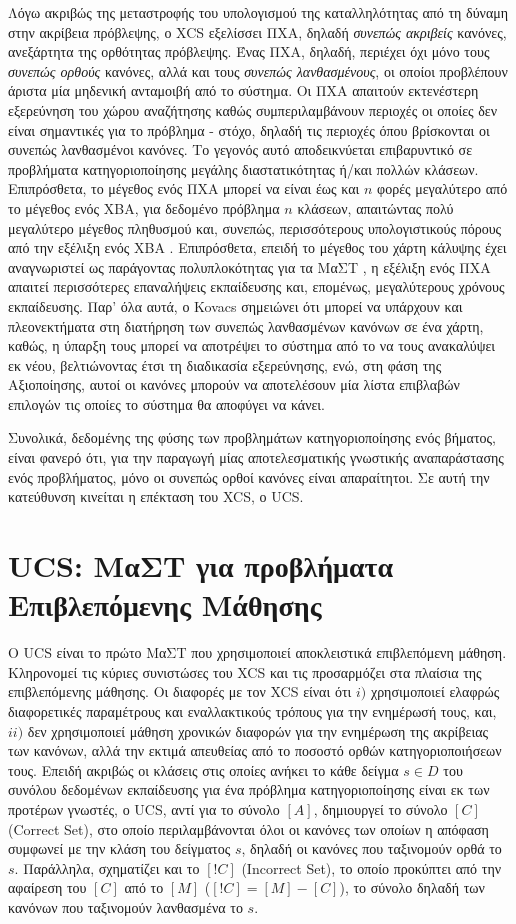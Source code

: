 Λόγω ακριβώς της μεταστροφής του υπολογισμού της καταλληλότητας από τη δύναμη στην ακρίβεια πρόβλεψης, ο XCS εξελίσσει ΠΧΑ, δηλαδή \emph{συνεπώς ακριβείς} κανόνες, ανεξάρτητα της ορθότητας πρόβλεψης. Ένας ΠΧΑ, δηλαδή, περιέχει όχι μόνο τους \emph{συνεπώς ορθούς} κανόνες, αλλά και τους \emph{συνεπώς λανθασμένους}, οι οποίοι προβλέπουν άριστα μία μηδενική ανταμοιβή από το σύστημα. Οι ΠΧΑ απαιτούν εκτενέστερη εξερεύνηση του χώρου αναζήτησης καθώς συμπεριλαμβάνουν περιοχές οι οποίες δεν είναι σημαντικές για το πρόβλημα - στόχο, δηλαδή τις περιοχές όπου βρίσκονται οι συνεπώς λανθασμένοι κανόνες. Το γεγονός αυτό αποδεικνύεται επιβαρυντικό σε προβλήματα κατηγοριοποίησης μεγάλης διαστατικότητας ή/και πολλών κλάσεων. Επιπρόσθετα, το μέγεθος ενός ΠΧΑ μπορεί να είναι έως και $n$ φορές μεγαλύτερο από το μέγεθος ενός ΧΒΑ, για δεδομένο πρόβλημα $n$ κλάσεων, απαιτώντας πολύ μεγαλύτερο μέγεθος πληθυσμού και, συνεπώς, περισσότερους υπολογιστικούς πόρους από την εξέλιξη ενός ΧΒΑ \cite{kovacs00}. Επιπρόσθετα, επειδή το μέγεθος του χάρτη κάλυψης έχει αναγνωριστεί ως παράγοντας πολυπλοκότητας για τα ΜαΣΤ \cite{kovacs01}, η εξέλιξη ενός ΠΧΑ απαιτεί περισσότερες επαναλήψεις εκπαίδευσης και, επομένως, μεγαλύτερους χρόνους εκπαίδευσης. Παρ' όλα αυτά, ο Kovacs \cite{kovacs00} σημειώνει ότι μπορεί να υπάρχουν και πλεονεκτήματα στη διατήρηση των συνεπώς λανθασμένων κανόνων σε ένα χάρτη, καθώς, η ύπαρξη τους μπορεί να αποτρέψει το σύστημα από το να τους ανακαλύψει εκ νέου, βελτιώνοντας έτσι τη διαδικασία εξερεύνησης, ενώ, στη φάση της Αξιοποίησης, αυτοί οι κανόνες μπορούν να αποτελέσουν μία λίστα επιβλαβών επιλογών τις οποίες το σύστημα θα αποφύγει να κάνει.

Συνολικά, δεδομένης της φύσης των προβλημάτων κατηγοριοποίησης ενός βήματος, είναι φανερό ότι, για την παραγωγή μίας αποτελεσματικής γνωστικής αναπαράστασης ενός προβλήματος, μόνο οι συνεπώς ορθοί κανόνες είναι απαραίτητοι. Σε αυτή την κατεύθυνση κινείται η επέκταση του XCS, ο UCS. 



\section{UCS: ΜαΣΤ για προβλήματα Επιβλεπόμενης Μάθησης}
Ο UCS είναι το πρώτο ΜαΣΤ που χρησιμοποιεί αποκλειστικά επιβλεπόμενη μάθηση. Κληρονομεί τις κύριες συνιστώσες του XCS και τις προσαρμόζει στα πλαίσια της επιβλεπόμενης μάθησης. Οι διαφορές με τον XCS είναι ότι $i)$ χρησιμοποιεί ελαφρώς διαφορετικές παραμέτρους και εναλλακτικούς τρόπους για την ενημέρωσή τους, και, $ii)$ δεν χρησιμοποιεί μάθηση χρονικών διαφορών για την ενημέρωση της ακρίβειας των κανόνων, αλλά την εκτιμά απευθείας από το ποσοστό ορθών κατηγοριοποιήσεων τους. Επειδή ακριβώς οι κλάσεις στις οποίες ανήκει το κάθε δείγμα $s \in D$ του συνόλου δεδομένων εκπαίδευσης για ένα πρόβλημα κατηγοριοποίησης είναι εκ των προτέρων γνωστές, ο UCS, αντί για το σύνολο $[A]$, δημιουργεί το σύνολο $[C]$ (Correct Set), στο οποίο περιλαμβάνονται όλοι οι κανόνες των οποίων η απόφαση συμφωνεί με την κλάση του δείγματος $s$, δηλαδή οι κανόνες που ταξινομούν ορθά το $s$. Παράλληλα, σχηματίζει και το $[!C]$ (Incorrect Set), το οποίο προκύπτει από την αφαίρεση του $[C]$ από το $[M]$ ($[!C] = [M] - [C]$), το σύνολο δηλαδή των κανόνων που ταξινομούν λανθασμένα το $s$.

